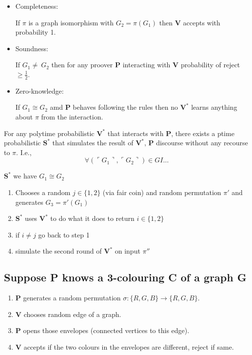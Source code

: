 \documentclass[a4paper,12pt]{article}
\theoremstyle{definition}
\theoremstyle{remark}
\begin{document}
\begin{itemize}
    \item Completeness:
    
    If $\pi$ is a graph isomorphism with $G_2 = \pi(G_1)$ then \textbf{V} accepts with probability 1.
    
    \item Soundness:
    
    If $G_1 \neq~ G_2$ then for any proover \textbf{P} interacting with \textbf{V} probability of reject $\geq \frac{1}{2}$.
    
    \item Zero-knowledge:
    
    If $G_1 \cong G_2$ amd \textbf{P} behaves following the rules then no $\textbf{V}^*$ learns anything about $\pi$ from the interaction.
\end{itemize}

For any polytime probabilistic $\textbf{V}^*$ that interacts with \textbf{P}, there exists a ptime probabilistic $\textbf{S}^*$ that simulates the result
of $\textbf{V}^*$, \textbf{P} discourse without any recourse to $\pi$. I.e.,
\begin{equation*}
    \forall (\ulcorner G_1 \urcorner, \ulcorner G_2 \urcorner) \in GI \dots
\end{equation*}

$\textbf{S}^*$ we have $G_1 \cong G_2$
\begin{enumerate}
    \item Chooses a random $j \in \{1, 2\}$ (via fair coin) and random permutation $\pi'$ and generates $G_3 = \pi'(G_1)$
    \item $\textbf{S}^*$ uses $\textbf{V}^*$ to do what it does to return $i \in \{1, 2\}$
    \item if $i \neq j$ go back to step 1
    \item simulate the second round of $\textbf{V}^*$ on input $\pi''$
\end{enumerate}

\subsection*{Suppose P knows a 3-colouring C of a graph G}

\begin{enumerate}
    \item \textbf{P} generates a random permutation $\sigma: \{R, G, B\} \to \{R, G, B\}$.
    \item \textbf{V} chooses random edge of a graph.
    \item \textbf{P} opens those envelopes (connected vertices to this edge).
    \item \textbf{V} accepts if the two colours in the envelopes are different, reject if same.
\end{enumerate}
\end{document}
